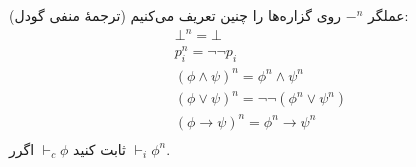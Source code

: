 (ترجمهٔ منفی گودل)
عملگر $\mathord{-}^n$ روی گزاره‌ها را چنین تعریف می‌کنیم:
\begin{gather*}
    \bot^n=\bot\\
    p_i^n=\neg\neg p_i\\
    (\phi\wedge\psi)^n=\phi^n\wedge\psi^n\\
    (\phi\vee\psi)^n=\neg\neg(\phi^n\vee\psi^n)\\
    (\phi\to\psi)^n=\phi^n\to\psi^n\\
\end{gather*}
ثابت کنید $\vdash_c\phi$ اگرر $\vdash_i\phi^n$.